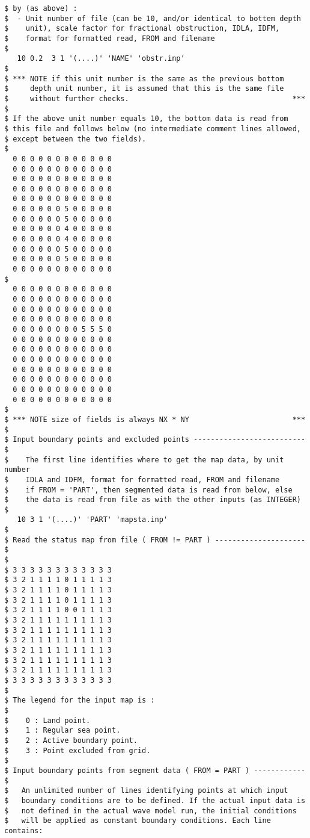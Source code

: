 \begin{verbatim}
$ by (as above) :
$  - Unit number of file (can be 10, and/or identical to bottem depth
$    unit), scale factor for fractional obstruction, IDLA, IDFM,
$    format for formatted read, FROM and filename
$
   10 0.2  3 1 '(....)' 'NAME' 'obstr.inp'
$
$ *** NOTE if this unit number is the same as the previous bottom
$     depth unit number, it is assumed that this is the same file
$     without further checks.                                      ***
$
$ If the above unit number equals 10, the bottom data is read from
$ this file and follows below (no intermediate comment lines allowed,
$ except between the two fields).
$
  0 0 0 0 0 0 0 0 0 0 0 0
  0 0 0 0 0 0 0 0 0 0 0 0
  0 0 0 0 0 0 0 0 0 0 0 0
  0 0 0 0 0 0 0 0 0 0 0 0
  0 0 0 0 0 0 0 0 0 0 0 0
  0 0 0 0 0 0 5 0 0 0 0 0
  0 0 0 0 0 0 5 0 0 0 0 0
  0 0 0 0 0 0 4 0 0 0 0 0
  0 0 0 0 0 0 4 0 0 0 0 0
  0 0 0 0 0 0 5 0 0 0 0 0
  0 0 0 0 0 0 5 0 0 0 0 0
  0 0 0 0 0 0 0 0 0 0 0 0
$
  0 0 0 0 0 0 0 0 0 0 0 0
  0 0 0 0 0 0 0 0 0 0 0 0
  0 0 0 0 0 0 0 0 0 0 0 0
  0 0 0 0 0 0 0 0 0 0 0 0
  0 0 0 0 0 0 0 0 5 5 5 0
  0 0 0 0 0 0 0 0 0 0 0 0
  0 0 0 0 0 0 0 0 0 0 0 0
  0 0 0 0 0 0 0 0 0 0 0 0
  0 0 0 0 0 0 0 0 0 0 0 0
  0 0 0 0 0 0 0 0 0 0 0 0
  0 0 0 0 0 0 0 0 0 0 0 0
  0 0 0 0 0 0 0 0 0 0 0 0
$
$ *** NOTE size of fields is always NX * NY                        ***
$
$ Input boundary points and excluded points -------------------------- $
$    The first line identifies where to get the map data, by unit number
$    IDLA and IDFM, format for formatted read, FROM and filename
$    if FROM = 'PART', then segmented data is read from below, else
$    the data is read from file as with the other inputs (as INTEGER)
$
   10 3 1 '(....)' 'PART' 'mapsta.inp'
$
$ Read the status map from file ( FROM != PART ) --------------------- $
$
$ 3 3 3 3 3 3 3 3 3 3 3 3
$ 3 2 1 1 1 1 0 1 1 1 1 3
$ 3 2 1 1 1 1 0 1 1 1 1 3
$ 3 2 1 1 1 1 0 1 1 1 1 3
$ 3 2 1 1 1 1 0 0 1 1 1 3
$ 3 2 1 1 1 1 1 1 1 1 1 3
$ 3 2 1 1 1 1 1 1 1 1 1 3
$ 3 2 1 1 1 1 1 1 1 1 1 3
$ 3 2 1 1 1 1 1 1 1 1 1 3
$ 3 2 1 1 1 1 1 1 1 1 1 3
$ 3 2 1 1 1 1 1 1 1 1 1 3
$ 3 3 3 3 3 3 3 3 3 3 3 3
$
$ The legend for the input map is :
$
$    0 : Land point.
$    1 : Regular sea point.
$    2 : Active boundary point.
$    3 : Point excluded from grid.
$
$ Input boundary points from segment data ( FROM = PART ) ------------ $
$   An unlimited number of lines identifying points at which input
$   boundary conditions are to be defined. If the actual input data is
$   not defined in the actual wave model run, the initial conditions
$   will be applied as constant boundary conditions. Each line contains:

\end{verbatim}
